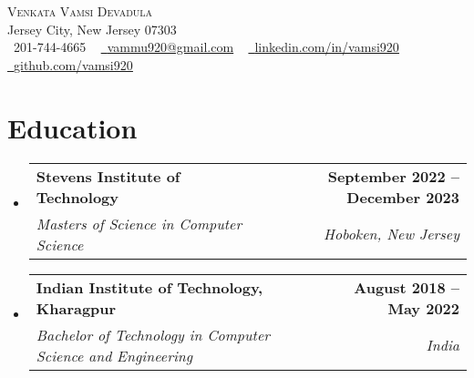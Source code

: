 \documentclass[letterpaper,11pt]{article}
\makeatletter
\newcommand{\resumeSubheading}[4]{
  \vspace{-2pt}\item
    \begin{tabular*}{1.0\textwidth}[t]{l@{\extracolsep{\fill}}r}
      \textbf{#1} & \textbf{\small #2} \\
      \textit{\small#3} & \textit{\small #4} \\
    \end{tabular*}\vspace{-7pt}
}
\newcommand{\resumeSubHeadingListStart}{\begin{itemize}[leftmargin=0.0in, label={}]}
\newcommand{\resumeSubHeadingListEnd}{\end{itemize}}
\makeatother
\begin{document}

\begin{center}
    {\Huge \scshape Venkata Vamsi Devadula} \\ \vspace{1pt}
    Jersey City, New Jersey 07303 \\ \vspace{1pt}
    \small \raisebox{-0.1\height}\faPhone\ 201-744-4665 ~ \href{mailto:vammu920@gmail.com}{\raisebox{-0.2\height}\faEnvelope\  \underline{vammu920@gmail.com}} ~ 
    \href{https://linkedin.com/in/vamsi920/}{\raisebox{-0.2\height}\faLinkedin\ \underline{linkedin.com/in/vamsi920}}  ~
    \href{https://github.com/vamsi920}{\raisebox{-0.2\height}\faGithub\ \underline{github.com/vamsi920}}

    \vspace{-8pt}
\end{center}


\section{Education}
  \resumeSubHeadingListStart
  \resumeSubheading
      {Stevens Institute of Technology}{September 2022 -- December 2023}
      {Masters of Science in Computer Science}{Hoboken, New Jersey}
    \resumeSubheading
      {Indian Institute of Technology, Kharagpur}{August 2018 -- May 2022}
      {Bachelor of Technology in Computer Science and Engineering}{India}
  \resumeSubHeadingListEnd
\end{document}

